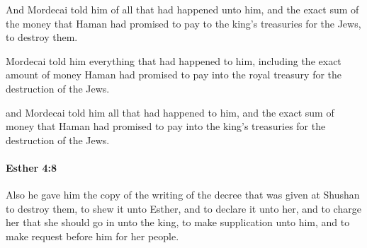 			\begin{versebox}
					\item[BHS] 
					\item[LXX] 
					\item[ASV] And Mordecai told him of all that had happened unto him, and the exact sum of the money that Haman had promised to pay to the king's treasuries for the Jews, to destroy them.
					\item[NIV] Mordecai told him everything that had happened to him, including the exact amount of money Haman had promised to pay into the royal treasury for the destruction of the Jews.
					\item[NRSV] and Mordecai told him all that had happened to him, and the exact sum of money that Haman had promised to pay into the king’s treasuries for the destruction of the Jews.
			\end{versebox}

		\paragraph{Esther 4:8} %
			\label{ESTHER-4-8}

			Also he gave him the copy of the writing of the decree that was given at Shushan to destroy them, to shew it unto Esther, and to declare it unto her, and to charge her that she should go in unto the king, to make supplication unto him, and to make request before him for her people.

